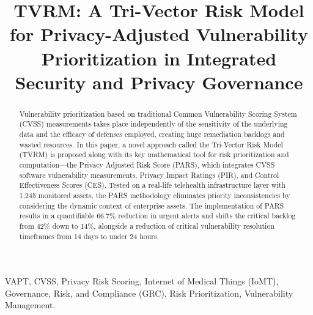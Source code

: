 \documentclass[conference,a4paper]{IEEEtran}
\begin{document}
\title{TVRM: A Tri-Vector Risk Model for Privacy-Adjusted Vulnerability Prioritization in Integrated Security and Privacy Governance}

\author{
\and
{}
}

\maketitle

\begin{abstract}
Vulnerability prioritization based on traditional Common Vulnerability Scoring System (CVSS) measurements takes place independently of the sensitivity of the underlying data and the efficacy of defenses employed, creating huge remediation backlogs and wasted resources. In this paper, a novel approach called the Tri-Vector Risk Model (TVRM) is proposed along with its key mathematical tool for risk prioritization and computation—the Privacy Adjusted Risk Score (PARS), which integrates CVSS software vulnerability measurements, Privacy Impact Ratings (PIR), and Control Effectiveness Scores (CES). Tested on a real-life telehealth infrastructure layer with 1,245 monitored assets, the PARS methodology eliminates priority inconsistencies by considering the dynamic context of enterprise assets. The implementation of PARS results in a quantifiable 66.7\% reduction in urgent alerts and shifts the critical backlog from 42\% down to 14\%, alongside a reduction of critical vulnerability resolution timeframes from 14 days to under 24 hours.
\end{abstract}

\begin{IEEEkeywords}
VAPT, CVSS, Privacy Risk Scoring, Internet of Medical Things (IoMT), Governance, Risk, and Compliance (GRC), Risk Prioritization, Vulnerability Management.
\end{IEEEkeywords}
\end{document}
